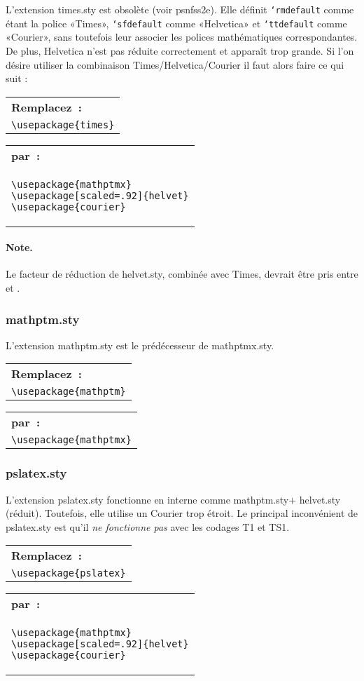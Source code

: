 \documentclass[fontsize=11pt, paper=a4, pagesize, captions=tableheading, numbers=enddot, toc=graduated, footnotes=multiple]{scrartcl}%
\makeatletter
\DeclareRobustCommand*{\Macro}[1]{\mbox{\texttt{\char`\\#1}}}
\newcommand{\Doku}[1]{\textsf{#1}\xspace}
\newcommand{\Paket}[1]{\textsf{#1.sty}\xspace}
\newenvironment{Ers}[1][\linewidth]{%
  \par\bigskip\noindent\marginline{\textcolor{gruen}{\boldmath $\triangleright$}}\begin{tabular}[t]{@{}p{0.5\textwidth}@{}}\textcolor{rot}{\textbf{\textsf{Remplacez~:}}%
}\\[2pt] \rahmenpr[#1]}%
{\endrahmenpr\end{tabular}}
\newenvironment{Dur}[1][0.5\textwidth]{%
\noindent\begin{tabular}[t]{@{}p{0.5\textwidth - 0.5em}@{}}\textcolor{gruen}{\textbf{\textsf{par~:}}}\\[2pt]\rahmenpg[#1]}%
{\endrahmenpg\end{tabular}\smallskip\noindent}
\makeatother
\begin{document}
L'extension \Paket{times} est obsolète (voir \Doku{psnfss2e}\cite{psnfss-04}). Elle définit \Macro{rmdefault} comme étant la police «Times», \Macro{sfdefault} comme «Helvetica» et \Macro{ttdefault} comme «Courier», sans toutefois leur associer les polices mathématiques correspondantes. De plus, Helvetica n'est pas réduite correctement et apparaît trop grande. Si l’on désire utiliser la combinaison Times/\/Helvetica/\/Courier il faut alors faire ce qui suit :
\begin{Ers}
  \verb|\usepackage{times}|
\end{Ers}
\begin{Dur}
\begin{verbatim}
\usepackage{mathptmx}
\usepackage[scaled=.92]{helvet}
\usepackage{courier}
\end{verbatim}
\end{Dur}

\paragraph{Note.}
\label{sec:anmerkung-1}

Le facteur de réduction de \Paket{helvet}, combinée avec Times, devrait être pris entre  et .

\subsubsection{\Paket{mathptm}}
\label{sec:mathptm}

L'extension \Paket{mathptm} est le prédécesseur de \Paket{mathptmx}. \

\begin{Ers}
  \verb+\usepackage{mathptm}+
\end{Ers}
\begin{Dur}
  \verb+\usepackage{mathptmx}+
\end{Dur}

\subsubsection{\Paket{pslatex}}
\label{sec:paketpslatex}

L'extension \Paket{pslatex} fonctionne en interne comme \Paket{mathptm}$+$ \Paket{helvet} (réduit). Toutefois, elle utilise un Courier trop étroit. Le principal inconvénient de \Paket{pslatex} est qu'il \emph{ne fonctionne pas} avec les codages T1 et TS1.

\begin{Ers}
  \verb+\usepackage{pslatex}+
\end{Ers}
\begin{Dur}
\begin{verbatim}
\usepackage{mathptmx}
\usepackage[scaled=.92]{helvet}
\usepackage{courier}
\end{verbatim}
\end{Dur}
\end{document}
